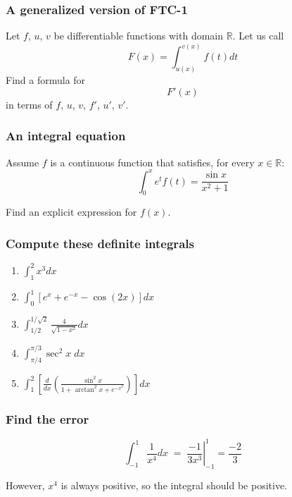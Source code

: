 \begin{frame}[t]
	\frametitle{A generalized version of FTC-1}

	Let $f$, $u$, $v$ be differentiable functions with domain $\mathbb{R}$. Let us
	call
	\[
		F(x) = \int_{u(x)}^{v(x)}f(t) dt
	\]
	Find a formula for
	\[
		F'(x)
	\]
	in terms of $f$, $u$, $v$, $f'$, $u'$, $v'$.
\end{frame}

\begin{frame}[t]
	\frametitle{An integral equation}

	Assume $f$ is a continuous function that satisfies, for every $x \in \mathbb{R}$:
	\[
		\int_{0}^{x}e^{t}f(t) = \frac{\sin x}{x^{2}+1}
	\]

	Find an explicit expression for $f(x)$.
\end{frame}

\begin{frame}[t]
	\frametitle{Compute these definite integrals}

	\begin{enumerate}
		\item $\displaystyle \int_{1}^{2}x^{3}dx$
			\vfill

		\item $\displaystyle \int_{0}^{1}\left[ e^{x}+ e^{-x}- \cos (2x) \right] dx$
			\vfill

		\item $\displaystyle \int_{1/2}^{1/\sqrt{2}}\frac{4}{\sqrt{1-x^{2}}}dx$
			\vfill

		\item $\displaystyle \int_{\pi/4}^{\pi/3}\sec^{2}x \; dx$
			\vfill

		\item $\displaystyle \int_{1}^{2}\left[ \frac{d}{dx}\left( \frac{\sin^{2}x }{1
			+ \arctan^{2}x + e^{-x^2}}\right) \right] dx$
			\vfill
	\end{enumerate}
\end{frame}

\begin{frame}[t]
	\frametitle{Find the error}

	\[
		\int_{-1}^{1}\frac{1}{x^{4}}dx \; = \; \left. \frac{-1}{3x^{3}}\right\vert_{-1}
		^{1}= \frac{-2}{3}
	\]

	However, $x^{4}$ is always positive, so the integral should be positive.
\end{frame}

